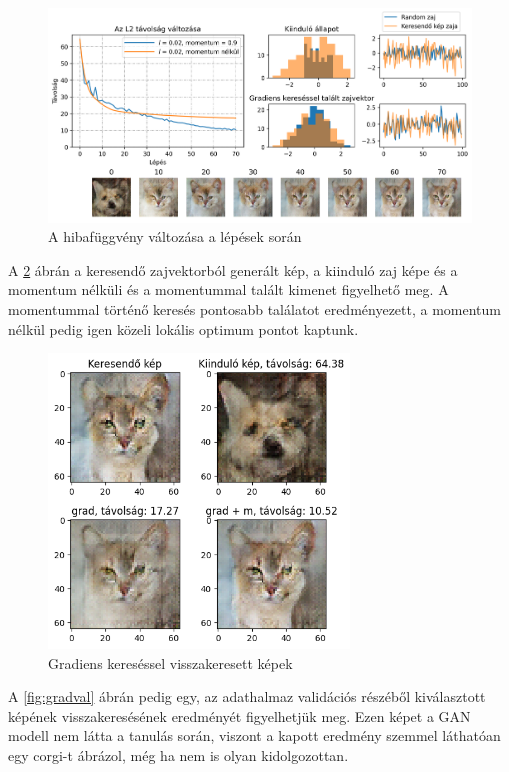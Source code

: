 \begin{figure}[h]
\centering
\includegraphics[width=15cm]{images/grad_losses.png}
\caption{A hibafüggvény változása a lépések során}
\label{fig:gradlosses}
\end{figure}

A \ref{fig:gradfound} ábrán a keresendő zajvektorból generált kép, a kiinduló zaj képe és a momentum nélküli és a momentummal talált kimenet figyelhető meg. A momentummal történő keresés pontosabb találatot eredményezett, a momentum nélkül pedig igen közeli lokális optimum pontot kaptunk.

\begin{figure}[h]
\centering
\includegraphics[width=8cm]{images/grad_found.png}
\caption{Gradiens kereséssel visszakeresett képek}
\label{fig:gradfound}
\end{figure}

A \ref{fig:gradval} ábrán pedig egy, az adathalmaz validációs részéből kiválasztott képének visszakeresésének eredményét figyelhetjük meg. Ezen képet a GAN modell nem látta a tanulás során, viszont a kapott eredmény szemmel láthatóan egy corgi-t ábrázol, még ha nem is olyan kidolgozottan.

